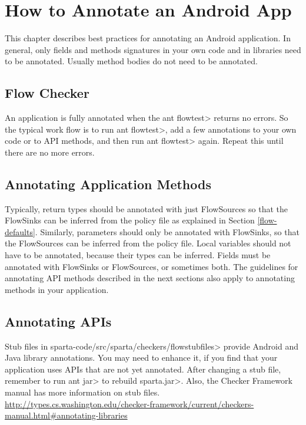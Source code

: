 \htmlhr
\chapter{How to Annotate an Android App\label{app-annotation}}

This chapter describes best practices for annotating an Android application.  In general, only 
fields and methods signatures in your own code and in libraries need to be annotated. Usually method bodies do not need to be annotated.

\section{Flow Checker\label{flowchecker}}
An application is fully annotated when the \<ant flowtest> returns no errors.  So the typical work flow is 
to run \<ant flowtest>, add a few annotations to your own code or to API methods, and then run \<ant flowtest> again.  
Repeat this until there are no more errors.



\section{Annotating Application Methods\label{sec:annomethods}}

Typically, return types should be annotated with just FlowSources so that the FlowSinks can be
 inferred from the policy file as explained in Section \ref{flow-defaults}. Similarly, parameters should
  only be annotated with FlowSinks, so that the FlowSources can be inferred from  the policy file.
    Local variables should not have to be annotated, because their types can be inferred. Fields 
    must be annotated with  FlowSinks or FlowSources, or sometimes both. The guidelines for annotating 
    API methods described in the next sections also apply to annotating methods in your application. 


\section{Annotating APIs\label{sec:annotatedAPI}}

Stub files in  \<sparta-code/src/sparta/checkers/flowstubfiles> provide Android and Java
library annotations.  You may need to enhance it, if you find that your application
uses APIs that are not yet annotated.  After changing a stub file, remember
to run \<ant jar> to rebuild \<sparta.jar>.
Also, the Checker Framework manual has more information on stub files. 
\url{http://types.cs.washington.edu/checker-framework/current/checkers-manual.html#annotating-libraries}

